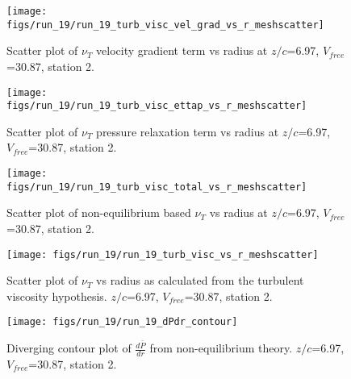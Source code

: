 \begin{figure}[H]
\centering
\texttt{[image: figs/run\_19/run\_19\_turb\_visc\_vel\_grad\_vs\_r\_meshscatter]}
\caption{Scatter plot of $\nu_T$ velocity gradient term vs radius at $z/c$=6.97, $V_{free}$=30.87, station 2.}
\end{figure}


\begin{figure}[H]
\centering
\texttt{[image: figs/run\_19/run\_19\_turb\_visc\_ettap\_vs\_r\_meshscatter]}
\caption{Scatter plot of $\nu_T$ pressure relaxation term vs radius at $z/c$=6.97, $V_{free}$=30.87, station 2.}
\end{figure}


\begin{figure}[H]
\centering
\texttt{[image: figs/run\_19/run\_19\_turb\_visc\_total\_vs\_r\_meshscatter]}
\caption{Scatter plot of non-equilibrium based $\nu_T$ vs radius at $z/c$=6.97, $V_{free}$=30.87, station 2.}
\end{figure}


\begin{figure}[H]
\centering
\texttt{[image: figs/run\_19/run\_19\_turb\_visc\_vs\_r\_meshscatter]}
\caption{Scatter plot of $\nu_T$ vs radius as calculated from the turbulent viscosity hypothesis. $z/c$=6.97, $V_{free}$=30.87, station 2.}
\end{figure}


\begin{figure}[H]
\centering
\texttt{[image: figs/run\_19/run\_19\_dPdr\_contour]}
\caption{Diverging contour plot of $\frac{d\bar{P}}{dr}$ from non-equilibrium theory. $z/c$=6.97, $V_{free}$=30.87, station 2.}
\end{figure}


